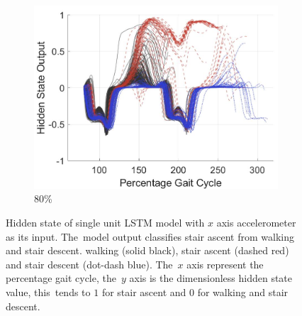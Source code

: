 \begin{figure}[!hbt]
     \hspace{0.5em}
     \begin{subfigure}[H]{0.28\textwidth}
         \centering
         \includegraphics[width=\textwidth]{content/4-LSTM_Behaviour/results/hidden_state/gyro_y_sa_v_w-sd/80_Participant_04.jpg}
         \caption{80\%}
         \label{subfig:gyro_y_w_v_sa_sd_80}
     \end{subfigure}
     \vspace{3pt}
    \caption[Hidden state of single unit LSTM model with $x$ axis accelerometer as its input.]{Hidden state of single unit LSTM model with $x$ axis accelerometer as its input. The~model output classifies stair ascent from walking and stair descent. walking (solid black), stair ascent (dashed red) and stair descent (dot-dash blue). The~$x$ axis represent the percentage gait cycle, the~$y$ axis is the dimensionless hidden state value, this~tends to $1$ for stair ascent and $0$ for walking and stair descent.}
    \label{fig:hidden-state-gyro-y-w_v_sa-sd}
\end{figure}

